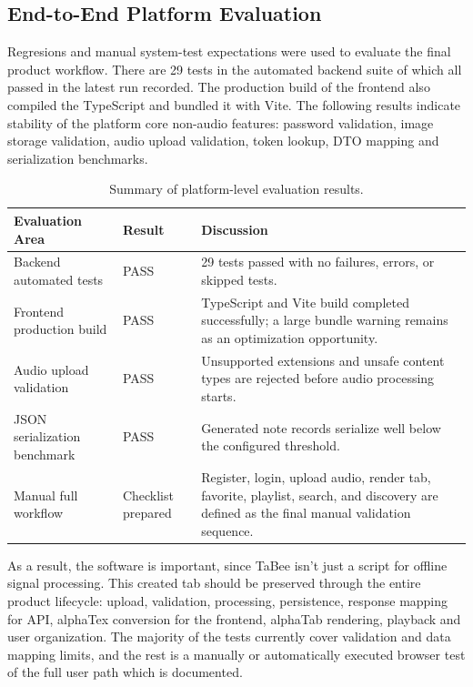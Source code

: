 \documentclass[a4paper, 12pt, titlepage]{article}
\begin{document}
\subsection{End-to-End Platform Evaluation}

Regresions and manual system-test expectations were used to evaluate the final product workflow. There are 29 tests in the automated backend suite of which all passed in the latest run recorded. The production build of the frontend also compiled the TypeScript and bundled it with Vite. The following results indicate stability of the platform core non-audio features: password validation, image storage validation, audio upload validation, token lookup, DTO mapping and serialization benchmarks.

\begin{table}[H]
    \centering
    \begin{tabular}{|p{}|p{}|p{}|}
        \hline
        \textbf{Evaluation Area} & \textbf{Result} & \textbf{Discussion} \\
        \hline
        Backend automated tests & PASS & 29 tests passed with no failures, errors, or skipped tests. \\
        \hline
        Frontend production build & PASS & TypeScript and Vite build completed successfully; a large bundle warning remains as an optimization opportunity. \\
        \hline
        Audio upload validation & PASS & Unsupported extensions and unsafe content types are rejected before audio processing starts. \\
        \hline
        JSON serialization benchmark & PASS & Generated note records serialize well below the configured threshold. \\
        \hline
        Manual full workflow & Checklist prepared & Register, login, upload audio, render tab, favorite, playlist, search, and discovery are defined as the final manual validation sequence. \\
        \hline
    \end{tabular}
    \caption{Summary of platform-level evaluation results.}
    \label{tab:tabee_platform_results}
\end{table}

As a result, the software is important, since TaBee isn't just a script for offline signal processing. This created tab should be preserved through the entire product lifecycle: upload, validation, processing, persistence, response mapping for API, alphaTex conversion for the frontend, alphaTab rendering, playback and user organization. The majority of the tests currently cover validation and data mapping limits, and the rest is a manually or automatically executed browser test of the full user path which is documented.
\end{document}
